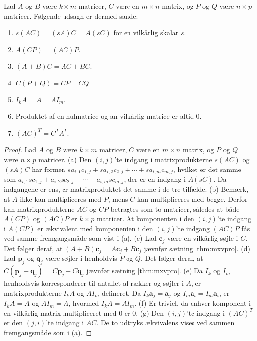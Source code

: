 \begin{thm}{}{}\label{thm:mxmulti}
Lad $A$ og $B$ være $k \times m$ matricer, $C$ være en $m \times n$ matrix, og $P$ og $Q$ være $n \times p$ matricer. Følgende udsagn er dermed sande:
\begin{enumerate}[label=(\alph*)]
\item $s(AC)=(sA)C=A(sC)$ for en vilkårlig skalar $s$.
\item $A(CP)=(AC)P$.
\item $(A+B)C=AC+BC$.
\item $C(P+Q)=CP+CQ$.
\item $I_kA=A=AI_m$.
\item Produktet af en nulmatrice og an vilkårlig matrice er altid $0$.
\item $(AC)^T=C^TA^T$.
\end{enumerate}
\end{thm}
\begin{proof}
Lad $A$ og $B$ være $k \times m$ matricer, $C$ være en $m \times n$ matrix, og $P$ og $Q$ være $n \times p$ matricer. 
(a) Den $(i,j)$'te indgang i matrixprodukterne $s(AC)$ og $(sA)C$ har formen $sa_{i,1}c_{1,j} + sa_{i,2}c_{2,j} + \cdots + sa_{i,m}c_{m,j}$, hvilket er det samme som $a_{i,1}sc_{1,j} + a_{i,2}sc_{2,j} + \cdots + a_{i,m}sc_{m,j}$, der er en indgang i $A(sC)$. 
Da indgangene er ens, er matrixproduktet det samme i de tre tilfælde.
(b) Bemærk, at $A$ ikke kan multipliceres med $P$, mens $C$ kan multipliceres med begge. 
Derfor kan matrixprodukterne $AC$ og $CP$ betragtes som to matricer, således at både $A(CP)$ og $(AC)P$ er $k \times p$ matricer. 
At komponenten i den $(i,j)$'te indgang i $A(CP)$ er ækvivalent med komponenten i den $(i,j)$'te indgang $(AC)P$ fås ved samme fremgangsmåde som vist i (a). 
(c) Lad $\textbf{c}_j$ være en vilkårlig søjle i $C$. 
Det følger deraf, at $(A+B)\textbf{c}_j=A\textbf{c}_j+B\textbf{c}_j$ jævnfør sætning \ref{thm:mxvpro}. 
(d) Lad $\textbf{p}_j$ og $\textbf{q}_j$ være søjler i henholdvis $P$ og $Q$. Det følger deraf, at $C(\textbf{p}_j+\textbf{q}_j)=C\textbf{p}_j+C\textbf{q}_j$ jævnfør sætning \ref{thm:mxvpro}. 
(e) Da $I_k$ og $I_m$ henholdsvis korresponderer til antallet af rækker og søjler i $A$, er matrixprodukterne $I_kA$ og $AI_m$ defineret. 
Da $I_k\textbf{a}_j=\textbf{a}_j$ og $I_m\textbf{a}_i=I_m\textbf{a}_i$, er $I_kA=A$ og $AI_m=A$, hvormed $I_kA=AI_m$.
(f) Er triviel, da enhver komponent i en vilkårlig matrix multipliceret med $0$ er $0$. 
(g) Den $(i,j)$'te indgang i $(AC)^T$ er den $(j,i)$'te indgang i $AC$. De to udtryks ækvivalens vises ved sammen fremgangsmåde som i (a).
\end{proof}